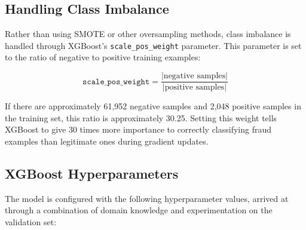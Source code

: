 \subsection{Handling Class Imbalance}
\label{sec:imbalance}

Rather than using SMOTE or other oversampling methods, class imbalance is handled through XGBoost's \texttt{scale\_pos\_weight} parameter. This parameter is set to the ratio of negative to positive training examples:

\begin{equation}
\texttt{scale\_pos\_weight} = \frac{|\text{negative samples}|}{|\text{positive samples}|}
\end{equation}

If there are approximately 61,952 negative samples and 2,048 positive samples in the training set, this ratio is approximately 30.25. Setting this weight tells XGBoost to give 30 times more importance to correctly classifying fraud examples than legitimate ones during gradient updates.

\subsection{XGBoost Hyperparameters}

The model is configured with the following hyperparameter values, arrived at through a combination of domain knowledge and experimentation on the validation set:


